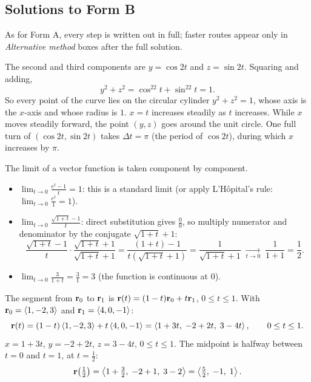 \subsection{Solutions to Form B}\label{sec:sol-b}

As for Form A, every step is written out in full; faster routes appear only in
\emph{Alternative method} boxes after the full solution.

 The second and third components
are $y=\cos2t$ and $z=\sin2t$. Squaring and adding,
\[
  y^2+z^2=\cos^22t+\sin^22t=1 .
\]
So every point of the curve lies on the circular cylinder $y^2+z^2=1$, whose axis is
the $x$-axis and whose radius is $1$.
 $x=t$ increases steadily as $t$ increases.
 While $x$ moves steadily forward, the point $(y,z)$ goes around
the unit circle. One full turn of $(\cos2t,\sin2t)$ takes $\Delta t=\pi$ (the period of
$\cos2t$), during which $x$ increases by $\pi$.


The limit of a vector function is taken component by component.
\begin{itemize}
\item $\displaystyle\lim_{t\to0}\frac{e^t-1}{t}=1$: this is a standard limit (or apply
      L'H\^opital's rule: $\lim_{t\to0}\frac{e^t}{1}=1$).
\item $\displaystyle\lim_{t\to0}\frac{\sqrt{1+t}-1}{t}$: direct substitution gives $\frac00$, so
      multiply numerator and denominator by the conjugate $\sqrt{1+t}+1$:
      \[
        \frac{\sqrt{1+t}-1}{t}\cdot\frac{\sqrt{1+t}+1}{\sqrt{1+t}+1}
        =\frac{(1+t)-1}{t\left(\sqrt{1+t}+1\right)}=\frac{1}{\sqrt{1+t}+1}\;\xrightarrow[t\to0]{}\;\frac{1}{1+1}=\frac12 .
      \]
\item $\displaystyle\lim_{t\to0}\frac{3}{1+t}=\frac31=3$ (the function is continuous at $0$).
\end{itemize}

 The segment from $\mathbf{r}_0$ to $\mathbf{r}_1$ is
$\mathbf{r}(t)=(1-t)\mathbf{r}_0+t\mathbf{r}_1$, $0\le t\le1$. With $\mathbf{r}_0=\left\langle 1,-2,3 \right\rangle$ and $\mathbf{r}_1=\left\langle 4,0,-1 \right\rangle$:
\[
  \mathbf{r}(t)=(1-t)\left\langle 1,-2,3 \right\rangle+t\left\langle 4,0,-1 \right\rangle=\left\langle 1+3t,\;-2+2t,\;3-4t \right\rangle,\qquad0\le t\le1 .
\]
 $x=1+3t$, $y=-2+2t$, $z=3-4t$, $0\le t\le1$.
 The midpoint is halfway between $t=0$ and $t=1$, at $t=\frac12$:
\[
  \mathbf{r}\!\left(\tfrac12\right)=\left\langle 1+\tfrac32,\;-2+1,\;3-2 \right\rangle=\left\langle \tfrac52,\;-1,\;1 \right\rangle.
\]


